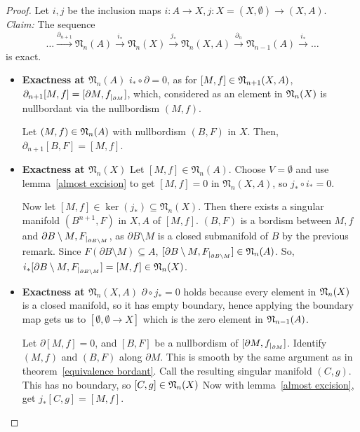 \documentclass[a4paper,11pt]{article}
\begin{document}
\begin{proof}\cite{dieck}
    Let \(i,j\) be the inclusion maps \(i:A\to X, j:X=(X,\emptyset)\to(X,A)\).\\
    \textit{Claim:} The sequence
    \[\dots\xrightarrow{\partial_{n+1}}\mathfrak{N}_n(A)\xrightarrow{i_\ast}\mathfrak{N}_n(X)\xrightarrow{j_\ast}\mathfrak{N}_n(X,A)\xrightarrow{\partial_n}\mathfrak{N}_{n-1}(A)\xrightarrow{i_\ast}\dots\]
    is exact.
    \begin{itemize}
        \item \textbf{Exactness at \(\mathfrak{N}_n(A)\)}
        \(i_\ast\circ \partial=0\), as for \([M,f]\in\mathfrak{N}_{n+1}(X,A)\), \(\partial_{n+1} [M,f]=[\partial M,f_{|_{\partial M}}]\), which, considered as an element in \(\mathfrak{N}_n(X)\) is nullbordant via the nullbordism \((M,f)\).

        Let \((M,f)\in\mathfrak{N}_n(A)\) with nullbordism \((B,F)\) in \(X\). Then, \(\partial_{n+1}[B,F]=[M,f]\).

        \item \textbf{Exactness at \(\mathfrak{N}_n(X)\)} Let \([M,f]\in\mathfrak{N}_n(A)\). Choose \(V=\emptyset\) and use lemma\ \ref{almost excision} to get \([M,f]=0\) in \(\mathfrak{N}_n(X,A)\), so \(j_\ast\circ i_\ast=0\).
        
        Now let \([M,f]\in\ker(j_\ast)\subseteq \mathfrak{N}_n(X)\). Then there exists a singular manifold \((B^{n+1},F)\) in \(X,A\) of \([M,f]\). \((B,F)\) is a bordism between \(M,f\) and \(\partial B\setminus M,F_{|_{\partial B\setminus M}}\), as \(\partial B\setminus M\) is a closed submanifold of \(B\) by the previous remark. Since \(F(\partial B\setminus M)\subseteq A\), \([\partial B\setminus M,F_{|_{\partial B\setminus M}}]\in\mathfrak{N}_n(A)\). So, \(i_\ast[\partial B\setminus M,F_{|_{\partial B\setminus M}}]=[M,f]\in\mathfrak{N}_n(X)\).

        \item \textbf{Exactness at \(\mathfrak{N}_n(X,A)\)} \(\partial \circ j_\ast=0\) holds because every element in \(\mathfrak{N}_n(X)\) is a closed manifold, so it has empty boundary, hence applying the boundary map gets us to \([\emptyset,\emptyset\to X]\) which is the zero element in \(\mathfrak{N}_{n-1}(A)\).
        
        Let \(\partial[M,f]=0\), and \([B,F]\) be a nullbordism of \([\partial M, f_{|_{\partial M}}]\). Identify \((M,f)\) and \((B,F)\) along \(\partial M\). This is smooth by the same argument as in theorem\ \ref{equivalence bordant}. Call the resulting singular manifold \((C,g)\). This has no boundary, so \([C,g]\in\mathfrak{N}_n(X)\) Now with lemma\ \ref{almost excision}, get \(j_\ast[C,g]=[M,f]\).
    \end{itemize}
\end{proof}
\end{document}
